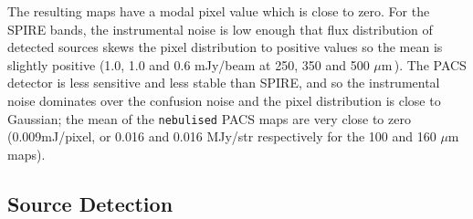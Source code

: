 \documentclass[useAMS,usenatbib]{mn2e}
\def\mic{ $\mu $m\,}
\begin{document}
The resulting maps have a modal pixel value which is close to
zero. For the SPIRE bands, the instrumental noise is low enough that
flux distribution of detected sources skews the pixel distribution to
positive values so the mean is slightly positive (1.0, 1.0 and 0.6
mJy/beam at 250, 350 and 500 \mic).
The PACS detector is less sensitive and less stable than SPIRE, and so the
instrumental noise dominates over the confusion noise and the pixel
distribution is close to Gaussian; the mean of the {\tt nebulised} PACS
maps are very close to zero (0.009mJ/pixel, or 0.016 and 0.016
MJy/str respectively for the 100 and 160\mic maps). 



\subsection{Source Detection} 
\end{document}
